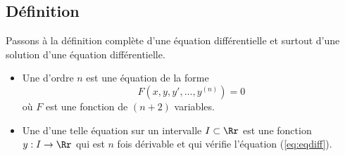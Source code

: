 \documentclass[class=report,crop=false]{standalone}
\begin{document}
\subsection{Définition}

Passons à la définition complète d'une équation différentielle
et surtout d'une solution d'une équation différentielle.

\begin{definition}
\sauteligne
\begin{itemize}
  \item Une  d'ordre $n$ est une équation de la forme
  \begin{equation}
    F\left(x,y,y',\dots ,y^{(n)}\right)=0
    \label{eq:eqdiff}
    \tag{$E$}
  \end{equation}
  où $F$ est une fonction de $(n+2)$ variables.

  \item Une  d'une telle équation sur un intervalle $I\subset \Rr$
  est une fonction $y :I \to \Rr$ qui est $n$ fois dérivable
  et qui vérifie l'équation (\ref{eq:eqdiff}).
\end{itemize}
\end{definition}
\end{document}
